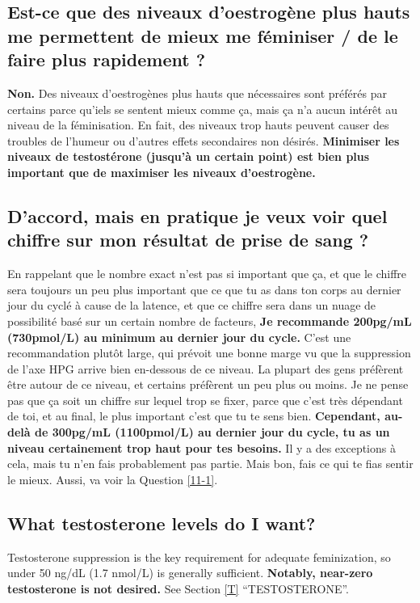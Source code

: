 \documentclass{article}
\begin{document}
\subsection{Est-ce que des niveaux d'oestrogène plus hauts me permettent de mieux me féminiser / de le faire plus rapidement ?}

\textbf{Non.} Des niveaux d'oestrogènes plus hauts que nécessaires sont préférés par certains parce qu'iels se sentent mieux comme ça, mais ça n'a aucun intérêt au niveau de la féminisation. En fait, des niveaux trop hauts peuvent causer des troubles de l'humeur ou d'autres effets secondaires non désirés. \textbf{Minimiser les niveaux de testostérone (jusqu'à un certain point) est bien plus important que de maximiser les niveaux d'oestrogène.}

\subsection{D'accord, mais en pratique je veux voir quel chiffre sur mon résultat de prise de sang ?}

En rappelant que le nombre exact n'est pas si important que ça, et que le chiffre sera toujours un peu plus important que ce que tu as dans ton corps au dernier jour du cyclé à cause de la latence, et que ce chiffre sera dans un nuage de possibilité basé sur un certain nombre de facteurs, \textbf{Je recommande 200pg/mL (730pmol/L) au minimum au dernier jour du cycle.} C'est une recommandation plutôt large, qui prévoit une bonne marge vu que la suppression de l'axe HPG arrive bien en-dessous de ce niveau. La plupart des gens préfèrent être autour de ce niveau, et certains préfèrent un peu plus ou moins. Je ne pense pas que ça soit un chiffre sur lequel trop se fixer, parce que c'est très dépendant de toi, et au final, le plus important c'est que tu te sens bien. \textbf{Cependant, au-delà de 300pg/mL (1100pmol/L) au dernier jour du cycle, tu as un niveau certainement trop haut pour tes besoins.} Il y a des exceptions à cela, mais tu n'en fais probablement pas partie. Mais bon, fais ce qui te fias sentir le mieux. Aussi, va voir la Question \ref{11-1}.

\subsection{What testosterone levels do I want?}

Testosterone suppression is the key requirement for adequate feminization, so under 50 ng/dL (1.7 nmol/L) is generally sufficient. \textbf{Notably, near-zero testosterone is not desired.} See Section \ref{T} “TESTOSTERONE”.
\end{document}
